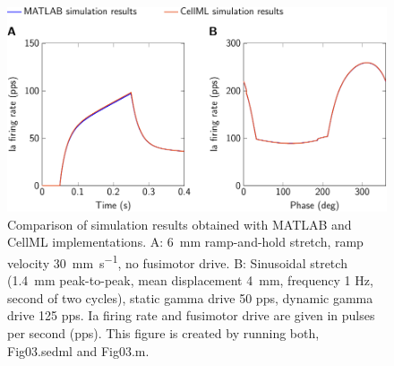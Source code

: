 \documentclass[fleqn,10pt]{physiome}
\begin{document}
\begin{figure}
    \includegraphics[width=\textwidth]{Figure3.pdf}
    \caption{Comparison of simulation results obtained with MATLAB and CellML implementations. A: \SI{6}{\milli\meter} ramp-and-hold stretch, ramp velocity \SI{30}{\milli\meter\per\second}, no fusimotor drive. B:  Sinusoidal stretch (\SI{1.4}{\milli\meter} peak-to-peak, mean displacement \SI{4}{\milli\meter}, frequency 1 Hz, second of two cycles), static gamma drive 50 pps, dynamic gamma drive 125 pps. Ia firing rate and fusimotor drive are given in pulses per second (pps). This figure is created by running both, Fig03.sedml and Fig03.m.}
    \label{fig:fig3}
\end{figure}
\end{document}
